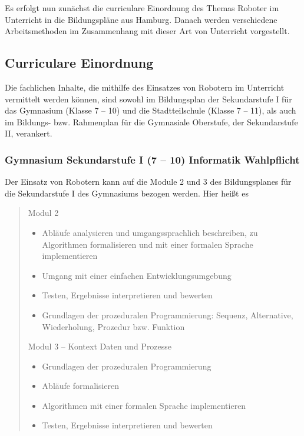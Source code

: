 \documentclass[paper=a4, pagesize, DIV=calc, BCOR=15.5mm, twoside=on, onecolumn=on, open = right, titlepage =on, parskip =half-, headsepline = on, footsepline = on, chapterprefix = on, appendixprefix = off, fontsize = 12pt, numbers = noenddot, abstract = on]{scrbook}
\numberwithin{equation}{chapter}
\theoremstyle{definition}
\theoremstyle{plain}
\theoremstyle{plain}
\theoremstyle{remark}
\theoremstyle{plain}
\theoremstyle{plain}
\begin{document}
Es erfolgt nun zunächst die curriculare Einordnung des Themas Roboter im Unterricht in die Bildungspläne aus Hamburg. Danach werden verschiedene Arbeitsmethoden im Zusammenhang mit dieser Art von Unterricht vorgestellt.

\subsection{Curriculare Einordnung}
Die fachlichen Inhalte, die mithilfe des Einsatzes von Robotern im Unterricht vermittelt werden können, sind sowohl im Bildungsplan der Sekundarstufe I für das Gymnasium (Klasse 7 -- 10) und die Stadtteilschule (Klasse 7 -- 11), als auch im Bildungs- bzw. Rahmenplan für die Gymnasiale Oberstufe, der Sekundarstufe II, verankert.

\subsubsection{Gymnasium Sekundarstufe I (7 -- 10) Informatik Wahlpflicht}
Der Einsatz von Robotern kann auf die Module 2 und 3 des Bildungsplanes für die Sekundarstufe I des Gymnasiums bezogen werden. Hier heißt es\\
 \begin{quote}
Modul 2
\begin{itemize}
\item Abläufe analysieren und umgangssprachlich beschreiben, zu Algorithmen formalisieren und mit einer formalen Sprache implementieren
\item Umgang mit einer einfachen Entwicklungsumgebung
\item Testen, Ergebnisse interpretieren und bewerten
\item Grundlagen der prozeduralen Programmierung: Sequenz, Alternative, Wiederholung, Prozedur bzw. Funktion
\end{itemize}
\vspace*{1cm}
Modul 3 -- Kontext Daten und Prozesse
\begin{itemize}
\item Grundlagen der prozeduralen Programmierung
\item Abläufe formalisieren
\item Algorithmen mit einer formalen Sprache implementieren
\item Testen, Ergebnisse interpretieren und bewerten \qquad \cite{gymsek1:11} 
\end{itemize}
 \end{quote}
\end{document}

